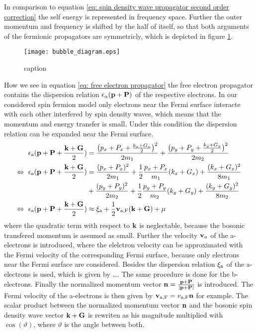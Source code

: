%
In comparison to equation \eqref{eq: spin density wave propagator second order correction} the self energy is represented in frequency space.
Further the outer momentum and frequency is shifted by the half of itself, so that both arguments of the fermionic propagators are symmetricly, which is depicted in figure \ref{fig: bubble diagram}.
%
\begin{figure}[t]
	\centering
	\texttt{[image: bubble\_diagram.eps]}
	\caption{caption}
	\label{fig: bubble diagram}
\end{figure}
%
How we see in equation \eqref{eq: free electron propagator} the free electron propagator contains the dispersion relation $\epsilon_{\alpha}(\vb{p}+\vb{P})$ of the respective electrons.
In our considered spin fermion model only electrons near the Fermi surface interacte with each other interfered by spin density waves, which means that the momentum and energy transfer is small.
Under this condition the dispersion relation can be expanded near the Fermi surface.
%
\begin{align}
	\epsilon_{\mt{a}}(\vb{p} + \vb{P} + \frac{\vb{k} + \vb{G}}{2}) &= 
		\frac{\big(p_{x} + P_{x} + \frac{k_{x} + G_{x}}{2}\big)^{2}}{2m_{1}} 
		+ 
		\frac{\big(p_{y} + P_{y} + \frac{k_{y} + G_{y}}{2}\big)^{2}}{2m_{2}} 
		\notag \\ 
	\Leftrightarrow\ \epsilon_{\mt{a}}(\vb{p} + \vb{P} + \frac{\vb{k} + \vb{G}}{2}) &=
		\frac{(p_{x} + P_{x})^{2}}{2m_{1}} + \frac{1}{2} \frac{p_{x}+P_{x}}{m_{1}}(k_{x}+G_{x}) + \frac{(k_{x}+G_{x})^{2}}{8m_{1}}
		\notag \\ &+
		\frac{(p_{y} + P_{y})^{2}}{2m_{2}} + \frac{1}{2} \frac{p_{y}+P_{y}}{m_{2}}(k_{y}+G_{y}) + \frac{(k_{y}+G_{y})^{2}}{8m_{2}}
		\notag \\
	\Leftrightarrow\ \epsilon_{\mt{a}}(\vb{p} + \vb{P} + \frac{\vb{k} + \vb{G}}{2}) &\approx
		\xi_{\mt{a}} + \frac{1}{2} \vb{v}_{\mt{a,F}}(\vb{k} + \vb{G}) + \mu
\end{align} 
%
where the quadratic term with respect to $\vb{k}$ is neglectable, because the bosonic transfered momentum is assumed as small.
Further the velocity $\vb{v}_{a}$ of the a-electrons is introduced, where the elelctron velocity can be approximated with the Fermi velocity of the corresponding Fermi surface, because only electrons near the Fermi surface are considered.
Besides the dispersion relation $\xi_{\mathrm{a}}$ of the a-electrons is used, which is given by \dots {}.
The same procedure is done for the b-electrons.
Finally the normalized momentum vector $\vb{n} = \frac{\vb{p}+\vb{P}}{|\vb{p}+\vb{P}|}$ is introduced.
The Fermi velocity of the a-electrons is then given by $\vb{v}_{\mt{a,F}} = v_{\mt{a,F}} \vb{n}$ for example.
The scalar product between the normalized momentum vector $\vb{n}$ and the bosonic spin density wave vector $\vb{k} + \vb{G}$ is rewriten as his magnitude multiplied with $\cos(\vartheta)$, where $\vartheta$ is the angle between both.

